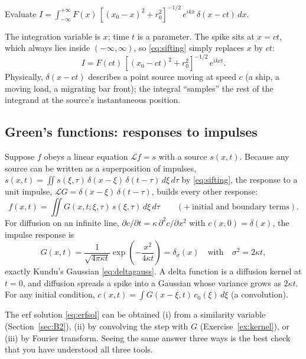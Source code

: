 \documentclass[11pt,letterpaper]{article}
\numberwithin{equation}{section}
\begin{document}
\begin{worked}\label{we:B4}
Evaluate $I=\int_{-\infty}^{+\infty}F(x)\,[(x_0-x)^2+r_0^2]^{-1/2}\,e^{ikx}\,\delta(x-ct)\,dx$.

The integration variable is $x$; time $t$ is a parameter. The spike sits at $x=ct$, which always lies inside $(-\infty,\infty)$,
so \eqref{eq:sifting} simply replaces $x$ by $ct$:
\[
I=F(ct)\,[(x_0-ct)^2+r_0^2]^{-1/2}\,e^{ikct}.
\]
Physically, $\delta(x-ct)$ describes a point source moving at speed $c$ (a ship, a moving load, a migrating bar front); the
integral ``samples'' the rest of the integrand at the source's instantaneous position.
\end{worked}

\subsection{Green's functions: responses to impulses}
Suppose $f$ obeys a linear equation $\mathcal L f=s$ with a source $s(x,t)$. Because any source can be written as a
superposition of impulses,
$s(x,t)=\iint s(\xi,\tau)\,\delta(x-\xi)\,\delta(t-\tau)\,d\xi\,d\tau$ by \eqref{eq:sifting}, the response to a unit impulse,
$\mathcal L G=\delta(x-\xi)\,\delta(t-\tau)$, builds every other response:
\begin{equation}\label{eq:green}
f(x,t)=\iint G(x,t;\xi,\tau)\,s(\xi,\tau)\,d\xi\,d\tau\qquad(+\ \text{initial and boundary terms}).
\end{equation}
For diffusion on an infinite line, $\partial c/\partial t=\kappa\,\partial^2c/\partial x^2$ with $c(x,0)=\delta(x)$, the impulse response is
\begin{equation}\label{eq:heatkernel}
G(x,t)=\frac{1}{\sqrt{4\pi\kappa t}}\exp\!\left(-\frac{x^2}{4\kappa t}\right)=\delta_\sigma(x)\quad\text{with}\quad\sigma^2=2\kappa t ,
\end{equation}
exactly Kundu's Gaussian \eqref{eq:deltagauss}. A delta function is a diffusion kernel at $t=0$, and diffusion spreads a spike
into a Gaussian whose variance grows as $2\kappa t$. For any initial condition, $c(x,t)=\int G(x-\xi,t)\,c_0(\xi)\,d\xi$ (a
convolution).

\begin{keyidea}
The erf solution \eqref{eq:erfsol} can be obtained (i) from a similarity variable (Section~\ref{sec:B2}), (ii) by convolving the
step with $G$ (Exercise~\ref{ex:kernel}), or (iii) by Fourier transform. Seeing the same answer three ways is the best check
that you have understood all three tools.
\end{keyidea}
\end{document}
